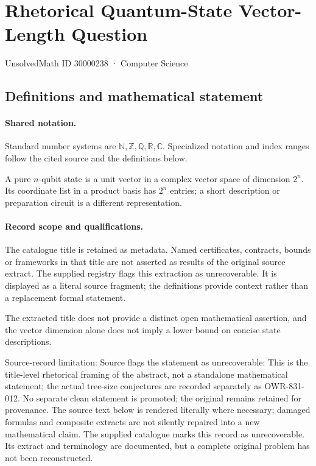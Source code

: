 \documentclass[11pt]{article}
\begin{document}
\setcounter{section}{30000237}
\section{Rhetorical Quantum-State Vector-Length Question}\label{30000238}
{\small\sffamily UnsolvedMath ID 30000238 · Computer Science}
\subsection{Definitions and mathematical statement}

\paragraph{Shared notation.}Standard number systems are $\mathbb N,\mathbb Z,\mathbb Q,\mathbb R,\mathbb C$. Specialized notation and index ranges follow the cited source and the definitions below.


A pure $n$-qubit state is a unit vector in a complex vector space of dimension $2^n$. Its coordinate list in a product basis has $2^n$ entries; a short description or preparation circuit is a different representation.
\paragraph{Record scope and qualifications.}
The catalogue title is retained as metadata. Named certificates, contracts, bounds or frameworks in that title are not asserted as results of the original source extract.
The supplied registry flags this extraction as unrecoverable. It is displayed as a literal source fragment; the definitions provide context rather than a replacement formal statement.

The extracted title does not provide a distinct open mathematical assertion, and the vector dimension alone does not imply a lower bound on concise state descriptions.

Source-record limitation: Source flags the statement as unrecoverable: This is the title-level rhetorical framing of the abstract, not a standalone mathematical statement; the actual tree-size conjectures are recorded separately as OWR-831-012. No separate clean statement is promoted; the original remains retained for provenance.
The source text below is rendered literally where necessary; damaged formulas and composite extracts are not silently repaired into a new mathematical claim.
The supplied catalogue marks this record as unrecoverable. Its extract and terminology are documented, but a complete original problem has not been reconstructed.
\end{document}
